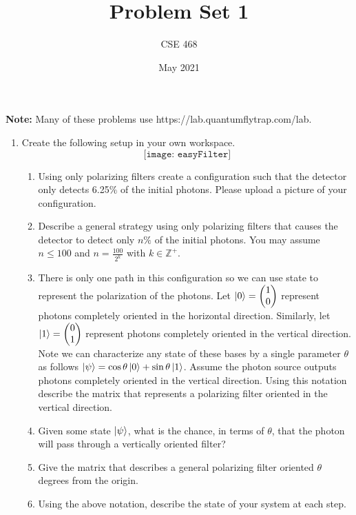 \documentclass[12pt]{article}
\title{Problem Set 1}
\author{CSE 468}
\date{May 2021}
\begin{document}
\maketitle

\noindent \textbf{Note:} Many of these problems use https://lab.quantumflytrap.com/lab.

\begin{enumerate}[font=\bfseries]
    \item Create the following setup in your own workspace.\\
    \[\texttt{[image: easyFilter]}\]
    \begin{enumerate}
        \item Using only polarizing filters create a configuration such that the detector only detects 6.25$\%$ of the initial photons. Please upload a picture of your configuration.
        \item Describe a general strategy using only polarizing filters that causes the detector to detect only $n\%$ of the initial photons. You may assume $n \leq 100$ and $n = \frac{100}{2^k}$ with $k\in\mathbb{Z}^+$.
        \item There is only one path in this configuration so we can use state to represent the polarization of the photons. Let $\ket{0} = \begin{pmatrix}1 \\ 0 \end{pmatrix}$ represent photons completely oriented in the horizontal direction. Similarly, let $\ket{1} = \begin{pmatrix}0 \\ 1 \end{pmatrix}$ represent photons completely oriented in the vertical direction. Note we can characterize any state of these bases by a single parameter $\theta$ as follows $\ket{\psi} = \cos{\theta}\ket{0} + \sin{\theta}\ket{1}$. Assume the photon source outputs photons completely oriented in the vertical direction. Using this notation describe the matrix that represents a polarizing filter oriented in the vertical direction.
        \item Given some state $\ket{\psi}$, what is the chance, in terms of $\theta$, that the photon will pass through a vertically oriented filter?
        \item Give the matrix that describes a general polarizing filter oriented $\theta$ degrees from the origin.
        \item Using the above notation, describe the state of your system at each step.

\end{enumerate}
\end{enumerate}
\end{document}
